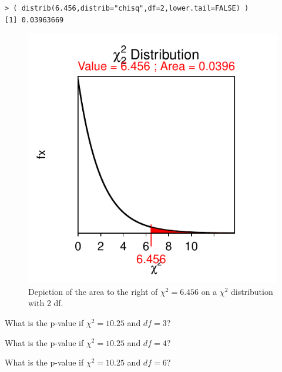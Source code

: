 \documentclass[10pt,openany]{book}\usepackage[]{graphicx}\usepackage[]{color}
\makeatletter
\newenvironment{kframe}{%
 \def\at@end@of@kframe{}%
 \ifinner\ifhmode%
  \def\at@end@of@kframe{\end{minipage}}%
  \begin{minipage}{\columnwidth}%
 \fi\fi%
 \def\FrameCommand##1{\hskip\@totalleftmargin \hskip-\fboxsep
 \colorbox{shadecolor}{##1}\hskip-\fboxsep
     \hskip-\linewidth \hskip-\@totalleftmargin \hskip\columnwidth}%
 \MakeFramed {\advance\hsize-\width
   \@totalleftmargin\z@ \linewidth\hsize
   \@setminipage}}%
 {\par\unskip\endMakeFramed%
 \at@end@of@kframe}
\newenvironment{knitrout}{}{} %
\makeatother
\begin{document}
\begin{knitrout}
\color{fgcolor}\begin{kframe}
\begin{verbatim}
> ( distrib(6.456,distrib="chisq",df=2,lower.tail=FALSE) )
[1] 0.03963669
\end{verbatim}
\end{kframe}\begin{figure}[hbtp]

{\centering \includegraphics[width=.4\linewidth]{Figs/chiarea1-1} 

}

\caption[Depiction of the area to the right of $\chi^2=6.456$ on a $\chi^2$ distribution with 2 df]{Depiction of the area to the right of $\chi^2=6.456$ on a $\chi^2$ distribution with 2 df.}\label{fig:chiarea1}
\end{figure}


\end{knitrout}

\vspace{-12pt}
\begin{exsection}
\vspace{-3pt}
  \item \label{revex:ChiPVal1} What is the p-value if $\chi^{2}=10.25$ and $df=3$? 
  \item \label{revex:ChiPVal2} What is the p-value if $\chi^{2}=10.25$ and $df=4$? 
  \item \label{revex:ChiPVal3} What is the p-value if $\chi^{2}=10.25$ and $df=6$? 
\end{exsection}
\end{document}
